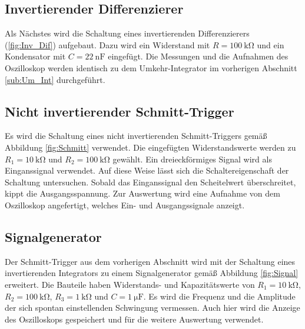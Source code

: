 \subsection{Invertierender Differenzierer}
Als Nächstes wird die Schaltung eines invertierenden Differenzierers (\ref{fig:Inv_Dif}) aufgebaut.
Dazu wird ein Widerstand mit $R=\SI{100}{\kilo\ohm}$ und ein Kondensator mit $C=\SI{22}{\nano\farad}$ eingefügt.
Die Messungen und die Aufnahmen des Oszilloskop werden identisch zu dem Umkehr-Integrator im vorherigen Abschnitt \ref{sub:Um_Int} durchgeführt.


\subsection{Nicht invertierender Schmitt-Trigger}
Es wird die Schaltung eines nicht invertierenden Schmitt-Triggers gemäß Abbildung \ref{fig:Schmitt} verwendet.
Die eingefügten Widerstandswerte werden zu $R_1=\SI{10}{\kilo\ohm}$ und $R_2=\SI{100}{\kilo\ohm}$ gewählt.
Ein dreieckförmiges Signal wird als Einganssignal verwendet.
Auf diese Weise lässt sich die Schaltereigenschaft der Schaltung untersuchen.
Sobald das Einganssignal den Scheitelwert überschreitet, kippt die Ausgangsspannung.
Zur Auswertung wird eine Aufnahme von dem Oszilloskop angefertigt, welches Ein- und Ausgangssignale anzeigt.


\subsection{Signalgenerator}
Der Schmitt-Trigger aus dem vorherigen Abschnitt wird mit der Schaltung eines invertierenden Integrators zu einem Signalgenerator gemäß Abbildung \ref{fig:Signal} erweitert.
Die Bauteile haben Widerstands- und Kapazitätswerte von $R_1=\SI{10}{\kilo\ohm}$, $R_2=\SI{100}{\kilo\ohm}$, $R_3=\SI{1}{\kilo\ohm}$ und $C=\SI{1}{\micro\farad}$.
Es wird die Frequenz und die Amplitude der sich spontan einstellenden Schwingung vermessen.
Auch hier wird die Anzeige des Oszilloskops gespeichert und für die weitere Auswertung verwendet.


